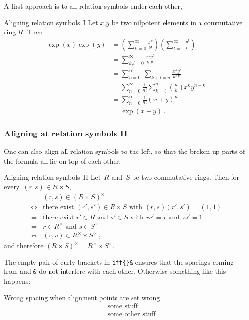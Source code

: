 A first approach is to all relation symbols under each other, 
\begin{showlatex}{Aligning relation symbols~I}
Let $x$,$y$ be two nilpotent elements in a commutative ring $R$.
Then
\begin{align*}
  \exp(x) \exp(y)
  &=
  \left( \sum_{k=0}^\infty \frac{x^k}{k!} \right)
  \left( \sum_{l=0}^\infty \frac{y^l}{l!} \right)
  \\
  &=
  \sum_{k,l=0}^\infty \frac{x^k y^l}{k! \, l!}
  \\
  &=
  \sum_{n=0}^\infty \, \sum_{k+l = n} \frac{x^k y^l}{k! \, l!}
  \\
  &=
  \sum_{n=0}^\infty \frac{1}{n!} \sum_{k=0}^n \binom{n}{k} x^k y^{n-k}
  \\
  &=
  \sum_{n=0}^\infty \frac{1}{n!} (x + y)^n
  \\
  &=
  \exp(x + y) \,.
\end{align*}
\end{showlatex}

\subsubsection{Aligning at relation symbols II}

One can also align all relation symbols to the left, so that the broken up parts of the formula all lie on top of each other.
\begin{showlatex}{Aligning relation symbols~II}
Let~$R$ and~$S$ be two commutative rings.
Then for every~$(r,s) \in R \times S$,
\begin{align*}
  {}&
  (r, s) \in (R \times S)^\times
  \\
  \iff{}&
  \text{there exist $(r', s') \in R \times S$ with $(r,s)(r',s') = (1,1)$}
  \\
  \iff{}&
  \text{there exist $r' \in R$ and $s' \in S$ with $rr' = r$ and $ss' = 1$}
  \\
  \iff{}&
  \text{$r \in R^\times$ and $s \in S^\times$}
  \\
  \iff{}&
  (r,s) \in R^\times \times S^\times \,,
\end{align*}
and therefore $(R \times S)^{\times} = R^\times \times S^\times$.
\end{showlatex}
The empty pair of curly brackets in \texttt{{\tbs}iff\{\}\&} ensures that the spacings coming from  and \texttt{\&} do not interfere with each other.
Otherwise something like this happens:
\begin{showlatex}{Wrong spacing when alignment points are set wrong}
  \begin{align*}
      &\text{some stuff} \\
    =&\text{some other stuff}
  \end{align*}
\end{showlatex}

